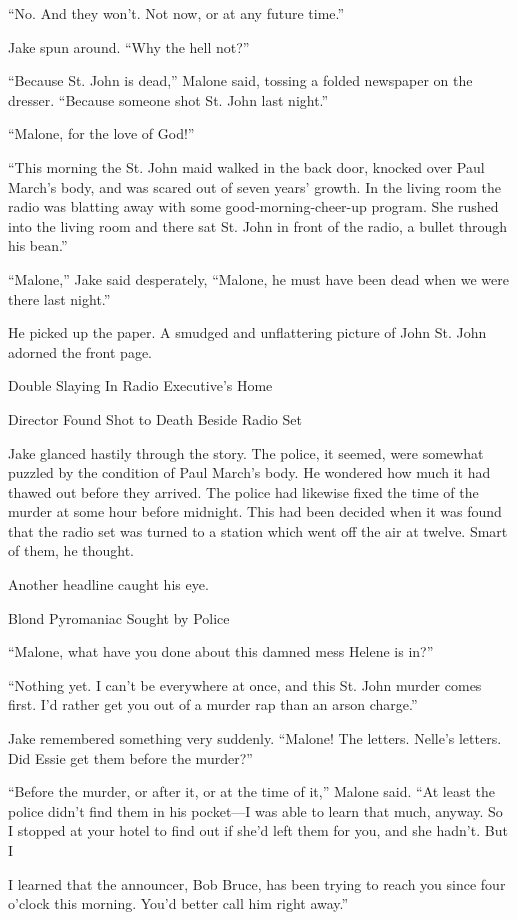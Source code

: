 \documentclass{novel}
\begin{document}
“No. And they won’t. Not now, or at any future time.”

Jake spun around. “Why the hell not?”

“Because St. John is dead,” Malone said, tossing a folded newspaper on the dresser. “Because someone shot St. John last night.”

“Malone, for the love of God!”

“This morning the St. John maid walked in the back door, knocked over Paul March’s body, and was scared out of seven years’ growth. In the living room the radio was blatting away with some good-morning-cheer-up program. She rushed into the living room and there sat St. John in front of the radio, a bullet through his bean.”

“Malone,” Jake said desperately, “Malone, he must have been dead when we were there last night.”

He picked up the paper. A smudged and unflattering picture of John St. John adorned the front page.

Double Slaying In Radio Executive’s Home

Director Found Shot to Death Beside Radio Set

Jake glanced hastily through the story. The police, it seemed, were somewhat puzzled by the condition of Paul March’s body. He wondered how much it had thawed out before they arrived. The police had likewise fixed the time of the murder at some hour before midnight. This had been decided when it was found that the radio set was turned to a station which went off the air at twelve. Smart of them, he thought.

Another headline caught his eye.

Blond Pyromaniac Sought by Police

“Malone, what have you done about this damned mess Helene is in?”

“Nothing yet. I can’t be everywhere at once, and this St. John murder comes first. I’d rather get you out of a murder rap than an arson charge.”

Jake remembered something very suddenly. “Malone! The letters. Nelle’s letters. Did Essie get them before the murder?”

“Before the murder, or after it, or at the time of it,” Malone said. “At least the police didn’t find them in his pocket—I was able to learn that much, anyway. So I stopped at your hotel to find out if she’d left them for you, and she hadn’t. But I

I learned that the announcer, Bob Bruce, has been trying to reach you since four o’clock this morning. You’d better call him right away.”
\end{document}
